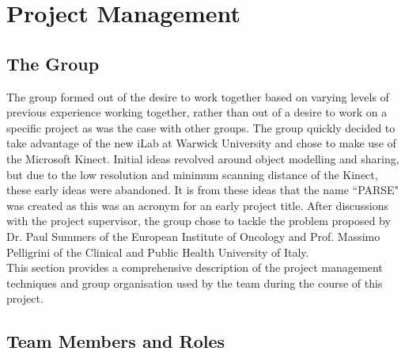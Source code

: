 \chapter{Project Management}
\label{project management}

\section{The Group}
The group formed out of the desire to work together based on varying levels of previous experience working together, rather than out of a desire to work on a specific project as was the case with other groups.
The group quickly decided to take advantage of the new iLab at Warwick University \cite{Kalvala2013} and chose to make use of the Microsoft Kinect. Initial ideas revolved around object modelling and sharing, but due to the low resolution and minimum scanning distance of the Kinect, these early ideas were abandoned. It is from these ideas that the name ``PARSE" was created as this was an acronym for an early project title. After discussions with the project supervisor, the group chose to tackle the problem proposed by Dr. Paul Summers of the European Institute of Oncology and Prof. Massimo Pelligrini of the Clinical and Public Health University of Italy. \\

This section provides a comprehensive description of the project management techniques and group organisation used by the team during the course of this project. \\

\section{Team Members and Roles}


